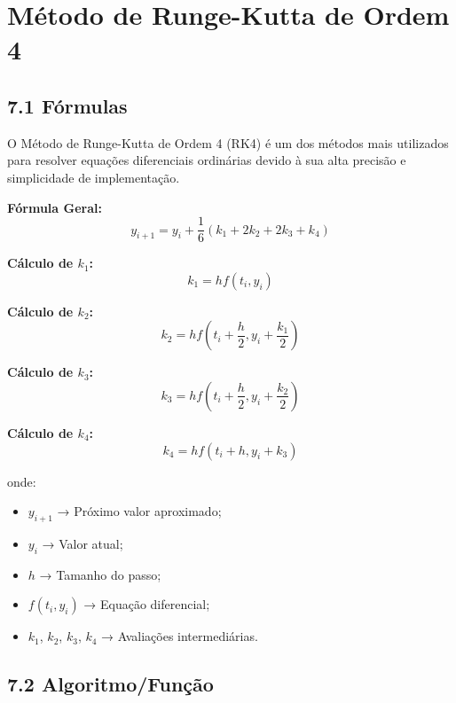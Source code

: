 \chapter{Método de Runge-Kutta de Ordem 4}

\section*{7.1 Fórmulas}

O Método de Runge-Kutta de Ordem 4 (RK4) é um dos métodos mais utilizados para resolver equações diferenciais ordinárias devido à sua alta precisão e simplicidade de implementação.

\textbf{Fórmula Geral:}
\begin{equation}
y_{i+1} = y_i + \frac{1}{6}(k_1 + 2k_2 + 2k_3 + k_4)
\end{equation}

\textbf{Cálculo de $k_1$:}
\begin{equation}
k_1 = h f(t_i, y_i)
\end{equation}

\textbf{Cálculo de $k_2$:}
\begin{equation}
k_2 = h f\left(t_i + \frac{h}{2}, y_i + \frac{k_1}{2}\right)
\end{equation}

\textbf{Cálculo de $k_3$:}
\begin{equation}
k_3 = h f\left(t_i + \frac{h}{2}, y_i + \frac{k_2}{2}\right)
\end{equation}

\textbf{Cálculo de $k_4$:}
\begin{equation}
k_4 = h f(t_i + h, y_i + k_3)
\end{equation}

onde:
\begin{itemize}
    \item $y_{i+1}$ → Próximo valor aproximado;
    \item $y_i$ → Valor atual;
    \item $h$ → Tamanho do passo;
    \item $f(t_i, y_i)$ → Equação diferencial;
    \item $k_1$, $k_2$, $k_3$, $k_4$ → Avaliações intermediárias.
\end{itemize}

\section*{7.2 Algoritmo/Função}


